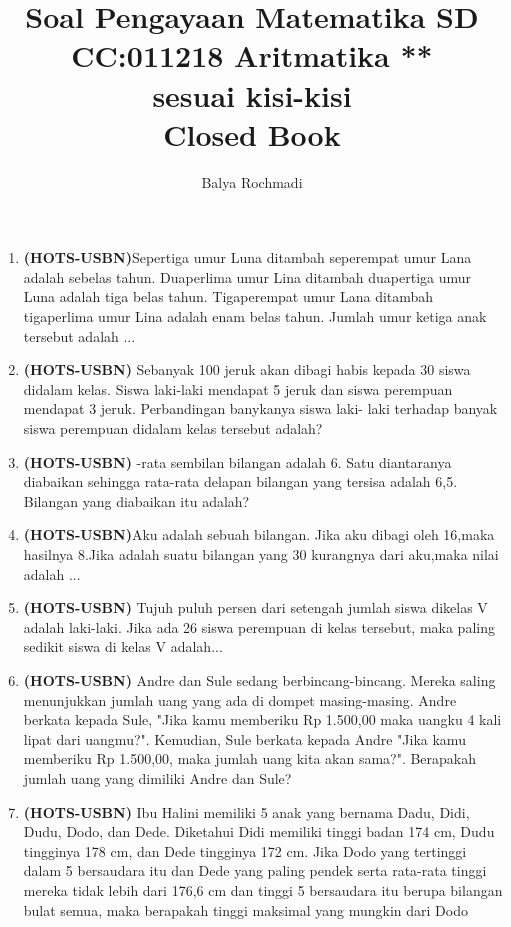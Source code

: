 \documentclass[12pt,a4paper,draft,final,oneside,twoside,openright,openany]{article}
\author{Balya Rochmadi}
\title{Soal Pengayaan Matematika SD \\CC:011218 Aritmatika **\\ \small sesuai kisi-kisi  \\
	Closed Book}
\begin{document}
	\maketitle
	\Large
	\begin{enumerate}
		\item \textbf{(HOTS-USBN)}Sepertiga umur Luna ditambah seperempat umur Lana adalah sebelas tahun. Duaperlima umur Lina ditambah duapertiga umur Luna adalah tiga belas tahun. Tigaperempat umur Lana ditambah tigaperlima umur Lina adalah enam belas tahun. Jumlah umur ketiga anak tersebut adalah ...
		\item\textbf{(HOTS-USBN)} Sebanyak 100 jeruk akan dibagi habis kepada 30 siswa didalam kelas. Siswa laki-laki mendapat 5 jeruk dan siswa perempuan mendapat 3 jeruk. Perbandingan banykanya siswa laki- laki terhadap banyak siswa perempuan didalam kelas tersebut adalah?
		\item \textbf{(HOTS-USBN)} -rata sembilan bilangan adalah 6. Satu diantaranya diabaikan sehingga rata-rata delapan bilangan yang tersisa adalah 6,5. Bilangan yang diabaikan itu adalah?
		\item \textbf{(HOTS-USBN)}Aku adalah sebuah bilangan. Jika aku dibagi oleh 16,maka hasilnya 8.Jika adalah suatu bilangan yang 30 kurangnya dari aku,maka nilai adalah ...
		\item \textbf{(HOTS-USBN)} Tujuh puluh persen dari setengah jumlah siswa dikelas V adalah laki-laki. Jika ada 26 siswa perempuan di kelas tersebut, maka paling sedikit siswa di kelas V adalah...
		\item \textbf{(HOTS-USBN)} Andre dan Sule sedang berbincang-bincang. Mereka saling menunjukkan jumlah uang yang ada di dompet masing-masing. Andre berkata kepada Sule, "Jika kamu memberiku Rp 1.500,00 maka uangku 4 kali lipat dari uangmu?". Kemudian, Sule berkata kepada Andre "Jika kamu memberiku Rp 1.500,00, maka jumlah uang kita akan sama?". Berapakah jumlah uang yang dimiliki Andre dan Sule?
		\item\textbf{(HOTS-USBN)} Ibu Halini memiliki 5 anak yang bernama Dadu, Didi, Dudu, Dodo, dan Dede. Diketahui Didi memiliki tinggi badan 174 cm, Dudu tingginya 178 cm, dan Dede tingginya 172 cm. Jika Dodo yang tertinggi dalam 5 bersaudara itu dan Dede yang paling pendek serta rata-rata tinggi mereka tidak lebih dari 176,6 cm dan tinggi 5 bersaudara itu berupa bilangan bulat semua, maka berapakah tinggi maksimal yang mungkin dari Dodo
		\end{enumerate}
\end{document}
